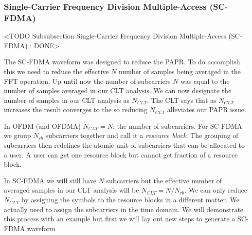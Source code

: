 \subsubsection{Single-Carrier Frequency Division Multiple-Access (SC-FDMA)}
	<TODO Subsubsection  Single-Carrier Frequency Division Multiple-Access (SC-FDMA) : DONE>

The \ac{SC-FDMA} waveform was designed to reduce the \ac{PAPR}. To do accomplish this we need to reduce the effective $N$ number of samples being averaged in the \ac{FFT} operation. Up until now the number of subcarriers $N$ was equal to the number of samples averaged in our \ac{CLT} analysis. We can now designate the number of samples in our \ac{CLT} analysis as $N_{CLT}$. The \ac{CLT} says that as $N_{CLT}$ increases the result converges to the  so reducing $N_{CLT}$ alleviates our \ac{PAPR} issue.

In \ac{OFDM} (and \ac{OFDMA}) $N_{CLT}=N$; the number of subcarriers. For \ac{SC-FDMA} we group $N_{rb}$ subcarriers together and call it a \emph{resource block}. The grouping of subcarriers then redefines the atomic unit of subcarriers that can be allocated to a user. A user can get one resource block but cannot get fraction of a resource block.

In \ac{SC-FDMA} we will still have $N$ subcarriers but the effective number of averaged samples in our \ac{CLT} analysis will be $N_{CLT}=N/N_{rb}$. We can only reduce $N_{CLT}$ by assigning the symbols to the resource blocks in a different matter. We actually need to assign the subcarriers in the time domain. We will demonstrate this process with an example but first we will lay out new steps to generate a \ac{SC-FDMA} waveform

